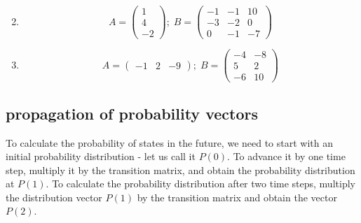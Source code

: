 \documentclass[
  letterpaper,
  DIV=11,
  numbers=noendperiod]{scrreprt}
\begin{document}
\begin{enumerate}
\[  \]
\item
  \[ 
  A =   \left(\begin{array}{c} 1 \\ 4 \\ -2\end{array}\right) ;  \;  B =  \left(\begin{array}{ccc}-1 & -1 & 10  \\-3 & -2 & 0 \\ 0 & -1 & -7 \end{array}\right)
  \]
\item
  \[ 
  A =  \left(\begin{array}{ccc} -1 &  2 & -9 \end{array}\right);  \;  B = \left(\begin{array}{cc}-4 & -8 \\5 & 2 \\-6 & 10\end{array}\right)
  \]
\end{enumerate}

\hypertarget{propagation-of-probability-vectors}{%
\subsection{propagation of probability
vectors}\label{propagation-of-probability-vectors}}

To calculate the probability of states in the future, we need to start
with an initial probability distribution - let us call it \(P(0)\). To
advance it by one time step, multiply it by the transition matrix, and
obtain the probability distribution at \(P(1)\). To calculate the
probability distribution after two time steps, multiply the distribution
vector \(P(1)\) by the transition matrix and obtain the vector \(P(2)\).
\end{document}
